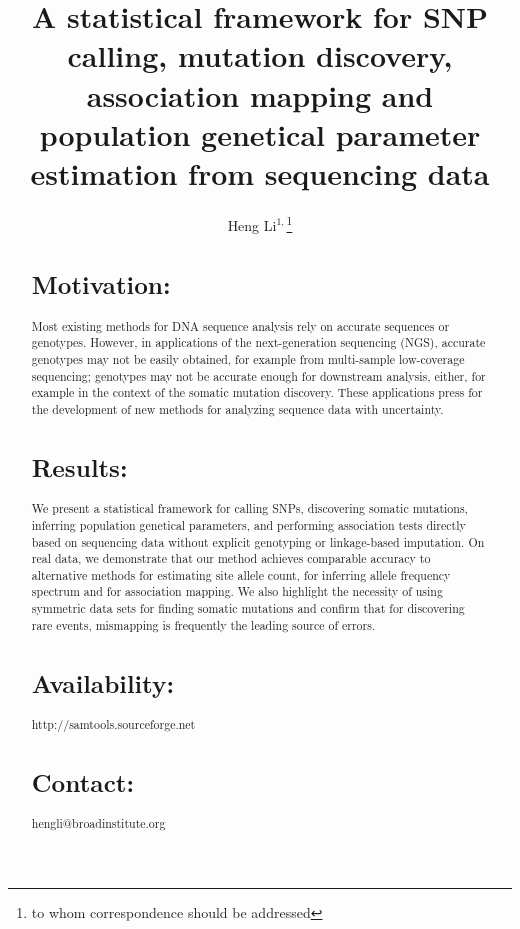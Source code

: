 \documentclass{bioinfo}
\begin{document}

\title[Inference using sequencing data]{A statistical framework for SNP calling, mutation discovery,
		association mapping and population genetical parameter estimation from sequencing data}

\author[Li]{Heng Li$^{1,}$\footnote{to whom correspondence should be addressed}}

\address{$^1$Broad Institute, 7 Cambridge Center, Cambridge, MA 02142, USA}

\maketitle

\begin{abstract}
\section{Motivation:}
Most existing methods for DNA sequence analysis rely on accurate sequences or
genotypes.  However, in applications of the next-generation sequencing (NGS),
accurate genotypes may not be easily obtained, for example from multi-sample
low-coverage sequencing; genotypes may not be accurate enough for downstream
analysis, either, for example in the context of the somatic mutation discovery.
These applications press for the development of new methods for analyzing
sequence data with uncertainty.
\section{Results:}
We present a statistical framework for calling SNPs, discovering somatic
mutations, inferring population genetical parameters, and performing
association tests directly based on sequencing data without explicit genotyping
or linkage-based imputation. On real data, we demonstrate that our method
achieves comparable accuracy to alternative methods for estimating site allele
count, for inferring allele frequency spectrum and for association mapping. We
also highlight the necessity of using symmetric data sets for finding somatic
mutations and confirm that for discovering rare events, mismapping is
frequently the leading source of errors.
\section{Availability:} http://samtools.sourceforge.net
\section{Contact:} hengli@broadinstitute.org
\end{abstract}
\end{document}
